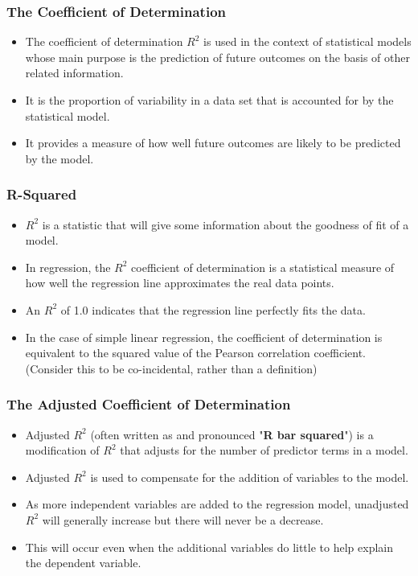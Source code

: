 \documentclass[PredictiveAnalytics101.tex]{subfiles}
\begin{document}
 

\begin{frame}
	\frametitle{The Coefficient of Determination}
	\Large
	\begin{itemize}
		\item The coefficient of determination $R^2$ is used in the context of statistical models whose main purpose is the prediction of future outcomes on the basis of other related information. 
		\item It is the proportion of variability in a data set that is accounted for by the statistical model. 
		\item It provides a measure of how well future outcomes are likely to be predicted by the model.
	\end{itemize}
\end{frame}

\begin{frame}
	\frametitle{R-Squared}
	\begin{itemize}
		\item $R^2$ is a statistic that will give some information about the goodness of fit of a model.
		\item In regression, the $R^2$ coefficient of determination is a statistical measure of how well the regression line approximates the real data points.
		\item An $R^2$ of 1.0 indicates that the regression line perfectly fits the data.
		
		\item In the case of simple linear regression, the coefficient of determination is equivalent to the squared value of the Pearson correlation coefficient. (Consider this to be co-incidental, rather than a definition)
	\end{itemize}
	
\end{frame}
\begin{frame}
	\frametitle{The Adjusted Coefficient of Determination}
	\Large
	\begin{itemize}
		\item Adjusted $R^2$ (often written as and pronounced "\textbf{R bar squared}") is a modification of $R^2$ that adjusts for the number of predictor terms in a model.
		\item  Adjusted $R^2$ is used to compensate for the addition of variables to the model. 
		\item As more independent variables are added to the regression model, unadjusted $R^2$ will generally increase but there will never be a decrease.  
		\item This will occur even when the additional variables do little to help explain the dependent variable.
	\end{itemize}  
\end{frame}
\end{document}
